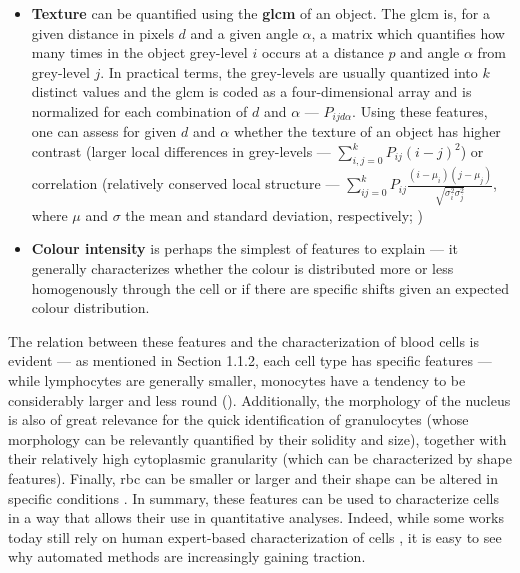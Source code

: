 \begin{itemize}
\begin{itemize}
    \end{itemize}
    \item \textbf{Texture} can be quantified using the \textbf{\ac{glcm}} of an object. The \ac{glcm} is, for a given distance in pixels $d$ and a given angle $\alpha$, a matrix which quantifies how many times in the object grey-level $i$ occurs at a distance $p$ and angle $\alpha$ from grey-level $j$. In practical terms, the grey-levels are usually quantized into $k$ distinct values and the \ac{glcm} is coded as a four-dimensional array and is normalized for each combination of $d$ and $\alpha$ --- $P_{ijd\alpha}$. Using these features, one can assess for given $d$ and $\alpha$ whether the texture of an object has higher contrast (larger local differences in grey-levels --- $\sum_{i,j=0}^{k}{P_{ij}(i-j)^2}$) or correlation (relatively conserved local structure --- $\sum_{ij=0}^{k}P_{ij}\frac{(i-\mu_i)(j-\mu_j)}{\sqrt{\sigma_i^2\sigma_j^2}}$, where $\mu$ and $\sigma$ the mean and standard deviation, respectively; )
    \item \textbf{Colour intensity} is perhaps the simplest of features to explain --- it generally characterizes whether the colour is distributed more or less homogenously through the cell or if there are specific shifts given an expected colour distribution.
\end{itemize}

\begin{figure}
	\label{fig:cnn}
\end{figure}

\begin{figure}
	\label{fig:cnn}
\end{figure}

The relation between these features and the characterization of blood cells is evident --- as mentioned in Section 1.1.2, each cell type has specific features --- while lymphocytes are generally smaller, monocytes have a tendency to be considerably larger and less round \cite{Bain2005-zg} (). Additionally, the morphology of the nucleus is also of great relevance for the quick identification of granulocytes (whose morphology can be relevantly quantified by their solidity and size), together with their relatively high cytoplasmic granularity (which can be characterized by shape features). Finally, \ac{rbc} can be smaller or larger and their shape can be altered in specific conditions \cite{Aslinia2006-en,Bain2014-oc}. In summary, these features can be used to characterize cells in a way that allows their use in quantitative analyses. Indeed, while some works today still rely on human expert-based characterization of cells \cite{Nagata2020-lh}, it is easy to see why automated methods are increasingly gaining traction.


